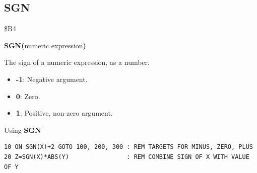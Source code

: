 \subsection{SGN}
\begin{description}[leftmargin=2cm,style=nextline]
\item [Token:]    \$B4

\item [Format:]   {\bf SGN(}numeric expression{\bf)}

\item [Returns:]  The sign of a numeric expression, as a number.

                  \begin{itemize}
                     \item {\bf -1}: Negative argument.
                     \item {\bf 0}: Zero.
                     \item {\bf 1}: Positive, non-zero argument.
                  \end{itemize}

\item [Example:]  Using {\bf SGN}

\begin{tcolorbox}[colback=black,coltext=white]
\verbatimfont{\codefont}
\begin{verbatim}
10 ON SGN(X)+2 GOTO 100, 200, 300 : REM TARGETS FOR MINUS, ZERO, PLUS
20 Z=SGN(X)*ABS(Y)                : REM COMBINE SIGN OF X WITH VALUE OF Y
\end{verbatim}
\end{tcolorbox}
\end{description}


\newpage
